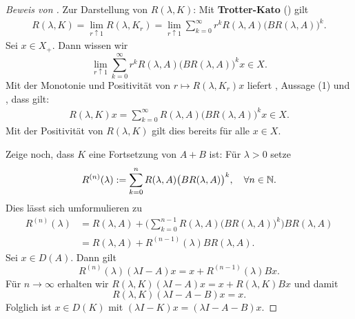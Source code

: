 \begin{proof}[Beweis von ]
\par
Zur Darstellung von $R(\lambda, K)$: Mit \textbf{Trotter-Kato} () gilt
\begin{align*}
R(\lambda, K)=\lim_{r\uparrow1}R(\lambda, K_r)=\lim_{r\uparrow 1}\sum_{k=0}^\infty r^k R(\lambda, A)\big(BR(\lambda, A)\big)^k.
\end{align*}
Sei $x\in X_+$. Dann wissen wir
\begin{equation*}
    \lim_{r\uparrow 1}\sum_{k=0}^\infty r^k R(\lambda, A)\big(BR(\lambda, A)\big)^k x\in X.
\end{equation*}
Mit der Monotonie und Positivität von $r\mapsto R(\lambda, K_r)x$ liefert , Aussage (1) und , dass gilt:
\begin{align*}
R(\lambda, K)x=\sum_{k=0}^\infty R(\lambda, A)\big(BR(\lambda, A)\big)^kx\in X.
\end{align*}
Mit der Positivität von $R(\lambda, K)$ gilt dies bereits für alle $x\in X$.

\par
Zeige noch, dass $K$ eine Fortsetzung von $A+B$ ist: Für $\lambda>0$ setze
\begin{equation*}
R^{(n)}(\lambda):= \sum_{k=0}^n R(\lambda, A)\big(BR(\lambda, A)\big)^k,\quad\forall n\in\mathbb{N}.
\end{equation*}
Dies lässt sich umformulieren zu
\begin{align*}
R^{(n)}(\lambda) 
&= R(\lambda, A) + \Big(\sum_{k=0}^{n-1}R(\lambda, A) \big(BR(\lambda, A)\big)^k\Big) BR(\lambda,  A)\\
&= R(\lambda, A) + R^{(n-1)}(\lambda) B R(\lambda, A).
\end{align*}
Sei $x\in D(A)$. Dann gilt
\begin{equation*}
R^{(n)}(\lambda)(\lambda I -A)x = x + R^{(n-1)}(\lambda)Bx.
\end{equation*}
Für $n\to \infty$ erhalten wir $R(\lambda, K)(\lambda I- A)x=x+R(\lambda, K)Bx$ und damit
\begin{equation*}
R(\lambda, K)(\lambda I -A-B)x=x.
\end{equation*}
Folglich ist $x\in D(K)$ mit $(\lambda I -K)x = (\lambda I -A-B)x$.
\end{proof}






